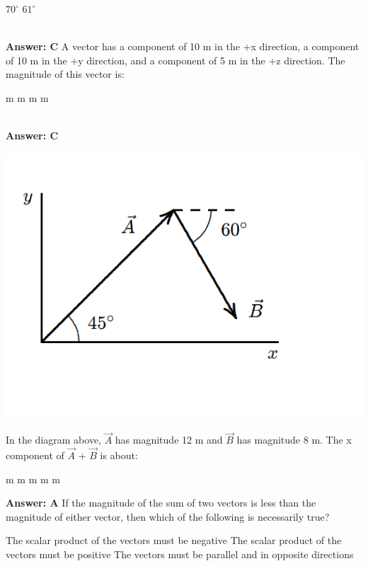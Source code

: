 \documentclass[12pt,addpoints]{exam}
\begin{document}
{{{\begin{questions}
\begin{oneparchoices}
						\choice $70^\circ$
						\choice $61^\circ$
					\end{oneparchoices}
					\\ \textbf{Answer: C}
					\question A vector has a component of 10 m in the +x direction, a component of 10 m in the +y direction,
					and a component of 5 m in the +z direction. The magnitude of this vector is: \\
					\begin{oneparchoices}
						 m
						 m
						 m
						 m
					\end{oneparchoices}
					\\ \textbf{Answer: C}
					\begin{center}
						\includegraphics[scale=0.3]{vecs3.png}
					\end{center}
					\question In the diagram above, $\vec{A}$ has magnitude 12 m and $\vec{B}$ has magnitude 8 m. The x component of $\vec{A}$ + $\vec{B}$
					is about: \\
					\begin{oneparchoices}
						\choice 12 m
						\choice 7.2 m
						\choice 19 m
						\choice 20 m
						\choice 18 m
					\end{oneparchoices}
					\textbf{Answer: A}
					\question If the magnitude of the sum of two vectors is less than the magnitude of either vector, then which of the following is necessarily true?
					\begin{choices}
						\choice The scalar product of the vectors must be negative
						\choice The scalar product of the vectors must be positive
						\choice The vectors must be parallel and in opposite directions

\end{choices}
\end{questions}}}}
\end{document}
